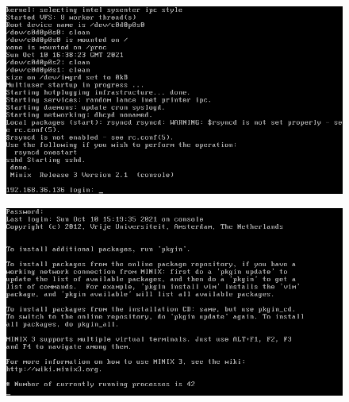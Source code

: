 \documentclass[a4paper]{article}
\begin{document}
\begin{figure}[H]
    \centering
    \includegraphics[width=1\textwidth]{5.png}
\end{figure}
\begin{figure}[H]
    \centering
    \includegraphics[width=1\textwidth]{6.png}
\end{figure}
\end{document}
